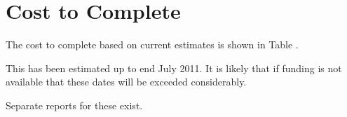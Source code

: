 \chapter{Cost to Complete}

The cost to complete based on current estimates is shown in Table .

This has been estimated up to end July 2011. It is likely that if funding is not available that these dates will be exceeded considerably.

Separate reports for these exist.

